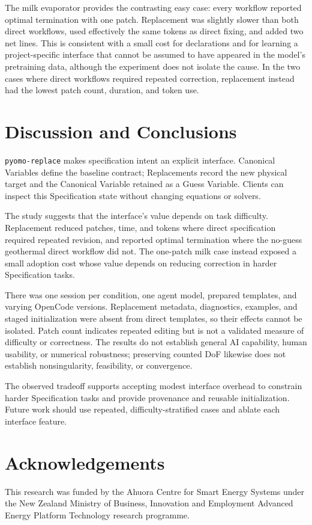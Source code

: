 \documentclass[10pt,letterpaper]{article}
\begin{document}
The milk evaporator provides the contrasting easy case: every workflow reported optimal termination with one patch. Replacement was slightly slower than both direct workflows, used effectively the same tokens as direct fixing, and added two net lines. This is consistent with a small cost for declarations and for learning a project-specific interface that cannot be assumed to have appeared in the model's pretraining data, although the experiment does not isolate the cause. In the two cases where direct workflows required repeated correction, replacement instead had the lowest patch count, duration, and token use.

\section{Discussion and Conclusions}
\texttt{pyomo-replace} makes specification intent an explicit interface. Canonical Variables define the baseline contract; Replacements record the new physical target and the Canonical Variable retained as a Guess Variable. Clients can inspect this Specification state without changing equations or solvers.

The study suggests that the interface's value depends on task difficulty. Replacement reduced patches, time, and tokens where direct specification required repeated revision, and reported optimal termination where the no-guess geothermal direct workflow did not. The one-patch milk case instead exposed a small adoption cost whose value depends on reducing correction in harder Specification tasks.

There was one session per condition, one agent model, prepared templates, and varying OpenCode versions. Replacement metadata, diagnostics, examples, and staged initialization were absent from direct templates, so their effects cannot be isolated. Patch count indicates repeated editing but is not a validated measure of difficulty or correctness. The results do not establish general AI capability, human usability, or numerical robustness; preserving counted DoF likewise does not establish nonsingularity, feasibility, or convergence.

The observed tradeoff supports accepting modest interface overhead to constrain harder Specification tasks and provide provenance and reusable initialization. Future work should use repeated, difficulty-stratified cases and ablate each interface feature.

\section*{Acknowledgements}
This research was funded by the Ahuora Centre for Smart Energy Systems under the New Zealand Ministry of Business, Innovation and Employment Advanced Energy Platform Technology research programme.
\end{document}
